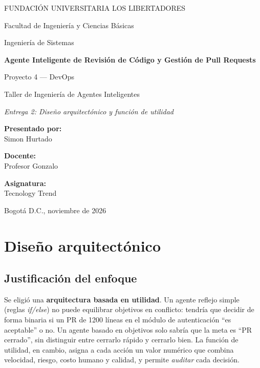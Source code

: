 \documentclass[11pt,a4paper]{article}
\begin{document}
\sloppy

\begin{titlepage}
\centering
{\large FUNDACIÓN UNIVERSITARIA LOS LIBERTADORES\par}
{\large Facultad de Ingeniería y Ciencias Básicas\par}
{\large Ingeniería de Sistemas\par}
\vspace{3cm}
{\Huge\bfseries Agente Inteligente de Revisión de Código y Gestión de Pull Requests\par}
\vspace{0.6cm}
{\Large Proyecto 4 --- DevOps\par}
\vspace{0.4cm}
{\large Taller de Ingeniería de Agentes Inteligentes\par}
\vspace{0.3cm}
{\large\itshape Entrega 2: Diseño arquitectónico y función de utilidad\par}
\vspace{3cm}
{\large\textbf{Presentado por:}\\ Simon Hurtado\par}
\vspace{0.8cm}
{\large\textbf{Docente:}\\ Profesor Gonzalo\par}
\vspace{0.8cm}
{\large\textbf{Asignatura:}\\ Tecnology Trend\par}
\vfill
{\large Bogotá D.C., noviembre de 2026\par}
\end{titlepage}

\tableofcontents
\newpage
\setcounter{section}{2}\setcounter{figure}{1}\setcounter{table}{2}\setcounter{equation}{0}
\section{Diseño arquitectónico}

\subsection{Justificación del enfoque}

Se eligió una \textbf{arquitectura basada en utilidad}. Un agente reflejo simple (reglas
\textit{if/else}) no puede equilibrar objetivos en conflicto: tendría que decidir de forma binaria si
un PR de 1200 líneas en el módulo de autenticación ``es aceptable'' o no. Un agente basado en
objetivos solo sabría que la meta es ``PR cerrado'', sin distinguir entre cerrarlo rápido y cerrarlo
bien. La función de utilidad, en cambio, asigna a cada acción un valor numérico que combina
velocidad, riesgo, costo humano y calidad, y permite \emph{auditar} cada decisión.
\end{document}
